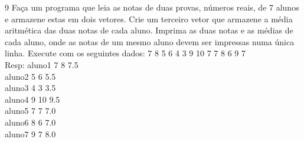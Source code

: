 \begin{exercicio}
  {9}
  {Faça um programa que leia as notas de duas provas, números reais, de 7 alunos e armazene estas em dois vetores. Crie um terceiro vetor que armazene a média aritmética das duas notas de cada aluno. Imprima as duas notas e as médias de cada aluno, onde as notas de um mesmo aluno devem ser impressas numa única linha.}
  Execute com os seguintes dados:
  7 8 5 6 4 3 9 10 7 7 8 6 9 7 \\
  Resp: aluno1 7 8 7.5 \\
        aluno2 5 6 5.5 \\
        aluno3 4 3 3.5 \\
        aluno4 9 10 9.5 \\
        aluno5 7 7 7.0 \\ 
        aluno6 8 6 7.0 \\
        aluno7 9 7 8.0
\end{exercicio}